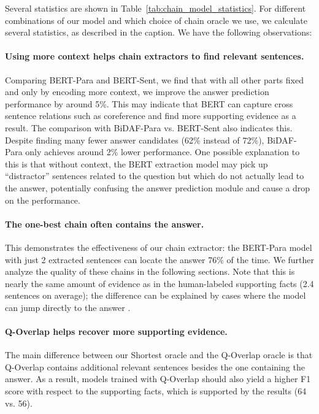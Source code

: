 \documentclass[11pt,a4paper]{article}
\begin{document}
Several statistics are shown in Table~\ref{tab:chain_model_statistics}. For different combinations of our model and which choice of chain oracle we use, we calculate several statistics, as described in the caption. We have the following observations:

\paragraph{Using more context helps chain extractors to find relevant sentences.} Comparing BERT-Para and BERT-Sent, we find that with all other parts fixed and only by encoding more context, we improve the answer prediction performance by around 5\%. This may indicate that BERT can capture cross sentence relations such as coreference and find more supporting evidence as a result. The comparison with BiDAF-Para vs. BERT-Sent also indicates this. Despite finding many fewer answer candidates (62\% instead of 72\%), BiDAF-Para only achieves around 2\% lower performance. One possible explanation to this is that without context, the BERT extraction model may pick up ``distractor'' sentences related to the question but which do not actually lead to the answer, potentially confusing the answer prediction module and cause a drop on the performance.

\paragraph{The one-best chain often contains the answer.} This demonstrates the effectiveness of our chain extractor: the BERT-Para model with just 2 extracted sentences can locate the answer 76\% of the time. We further analyze the quality of these chains in the following sections. Note that this is nearly the same amount of evidence as in the human-labeled supporting facts (2.4 sentences on average); the difference can be explained by cases where the model can jump directly to the answer \citep{chen2019understanding}.

\paragraph{Q-Overlap helps recover more supporting evidence.} The main difference between our Shortest oracle and the Q-Overlap oracle is that Q-Overlap contains additional relevant sentences besides the one containing the answer. As a result, models trained with Q-Overlap should also yield a higher F1 score with respect to the supporting facts, which is supported by the results (64 vs. 56).
\end{document}
